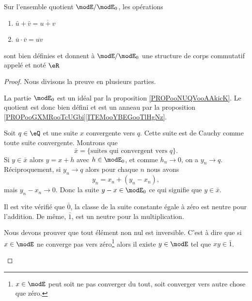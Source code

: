 \begin{theoremDef}       \label{DefooFKYKooOngSCB}
    Sur l'ensemble quotient \( \modE/\modE_0\), les opérations
    \begin{enumerate}
        \item
            \( \bar u+\bar v=\overline{ u+v }\)
        \item
            \( \bar u\cdot \bar v=\overline{ uv }\)
    \end{enumerate}
    sont bien définies et donnent à \( \modE/\modE_0\) une structure de corps commutatif appelé  et noté \( \eR\)
\end{theoremDef}

\begin{proof}
    Nous divisons la preuve en plusieurs parties.
    \begin{subproof}
    \item[Les opérations sont bien définies]
        La partie \( \modE_0\) est un idéal par la proposition \ref{PROPooNUQVooAAkicK}. Le quotient est donc bien défini et est un anneau par la proposition \ref{PROPooGXMRooTcUGbi}\ref{ITEMooYBEGooTlHgNz}.

    \item[Caractérisation des classes]
        Soit \( q\in \eQ\) et une suite \( x\) convergente vers \( q\). Cette suite est de Cauchy comme toute suite convergente. Montrons que
        \begin{equation}
            \bar x=\{ \text{suites qui convergent vers } q \}.
        \end{equation}
        Si \( y\in\bar x\) alors \( y=x+h\) avec \( h\in \modE_0\), et comme \( h_n\to 0\), on a \( y_n\to q\). Réciproquement, si \( y_n\to q\) alors pour chaque \( n\) nous avons
        \begin{equation}
            y_n=x_n+(y_n-x_n),
        \end{equation}
        mais \( y_n-x_n\to 0\). Donc la suite \( y-x\in\modE_0\) ce qui signifie que \( y\in\bar x\).
    \item[Neutre et unité]
        Il est vite vérifié que \( \bar 0\), la classe de la suite constante égale à zéro est neutre pour l'addition. De même, \( \bar 1\), est un neutre pour la multiplication.
    \item[Corps]
        Nous devons prouver que tout élément non nul est inversible. C'est à dire que si \( x\in\modE\) ne converge pas vers zéro\footnote{\( x\in\modE\) peut soit ne pas converger du tout, soit converger vers autre chose que zéro.} alors il existe \( y\in \modE\) tel que \( xy\in\bar 1\).


\end{subproof}
\end{proof}
